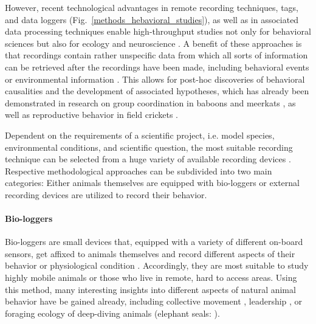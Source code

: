 \documentclass[11pt,pdftex]{article}
\newcommand{\fref}[1]{\textup{\ref{#1}}}
\newcommand{\fig}{Fig.}
\newcommand{\figref}[1]{\fig~\fref{#1}}
\begin{document}
However, recent technological advantages in remote recording techniques, tags, and data loggers (\figref{methods_hebavioral_studies}), as well as in associated data processing techniques enable high-throughput studies not only for behavioral sciences but also for ecology and neuroscience \citep{Anderson2014, Dell2014, Hughey2018, Mathis2018}. A benefit of these approaches is that recordings contain rather unspecific data from which all sorts of information can be retrieved after the recordings have been made, including behavioral events or environmental information \citep{Gomez2014}. This allows for post-hoc discoveries of behavioral causalities and the development of associated hypotheses, which has already been demonstrated in research on group coordination in baboons \citep{Strandburg2015} and meerkats \citep{StrandburgPeshkin2019}, as well as reproductive behavior in field crickets \citep{Rodriguez2010}. 

Dependent on the requirements of a scientific project, i.e. model species, environmental conditions, and scientific question, the most suitable recording technique can be selected from a huge variety of available recording devices \citep{Hughey2018}. Respective methodological approaches can be subdivided into two main categories: Either animals themselves are equipped with bio-loggers or external recording devices are utilized to record their behavior.

\paragraph{Bio-loggers} 

Bio-loggers are small devices that, equipped with a variety of different on-board sensors, get affixed to animals themselves and record different aspects of their behavior or physiological condition \citep{Menzel2005, Baktoft2015, Strandburg2015}. Accordingly, they are most suitable to study highly mobile animals or those who live in remote, hard to access areas. Using this method, many interesting insights into different aspects of natural animal behavior have be gained already, including collective movement \citep{Nagy2010, Strandburg2015}, leadership \citep{Strandburg2018}, or foraging ecology of deep-diving animals (elephant seals: \citealp{Robinson2012}). 
\end{document}
